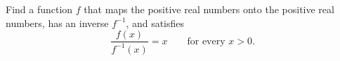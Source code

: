 Find a function $f$ that maps the positive real numbers onto the positive real numbers, has an inverse $f^{-1}$, and satisfies
\[\dfrac{f(x)}{f^{-1}(x)}=x\qquad\text{for every }x>0.\]
